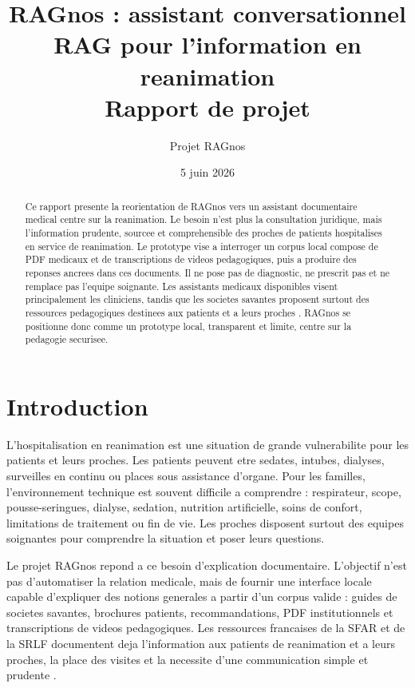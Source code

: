 \documentclass[11pt,a4paper]{article}
\title{\textbf{RAGnos : assistant conversationnel RAG pour l'information en reanimation}\\
\large Rapport de projet}
\author{Projet RAGnos}
\date{5 juin 2026}
\begin{document}
\maketitle

\begin{abstract}
Ce rapport presente la reorientation de RAGnos vers un assistant documentaire medical centre sur la reanimation. Le besoin n'est plus la consultation juridique, mais l'information prudente, sourcee et comprehensible des proches de patients hospitalises en service de reanimation. Le prototype vise a interroger un corpus local compose de PDF medicaux et de transcriptions de videos pedagogiques, puis a produire des reponses ancrees dans ces documents. Il ne pose pas de diagnostic, ne prescrit pas et ne remplace pas l'equipe soignante. Les assistants medicaux disponibles visent principalement les cliniciens, tandis que les societes savantes proposent surtout des ressources pedagogiques destinees aux patients et a leurs proches \autocite{uptodateExpertAI,clinicalKeyAI,dynaAI,openEvidence,doximityAsk,sccmPatientFamilyResources,esicmPatientFamily,icsPatientResources}. RAGnos se positionne donc comme un prototype local, transparent et limite, centre sur la pedagogie securisee.
\end{abstract}

\tableofcontents
\newpage

\section{Introduction}

L'hospitalisation en reanimation est une situation de grande vulnerabilite pour les patients et leurs proches. Les patients peuvent etre sedates, intubes, dialyses, surveilles en continu ou places sous assistance d'organe. Pour les familles, l'environnement technique est souvent difficile a comprendre : respirateur, scope, pousse-seringues, dialyse, sedation, nutrition artificielle, soins de confort, limitations de traitement ou fin de vie. Les proches disposent surtout des equipes soignantes pour comprendre la situation et poser leurs questions.

Le projet RAGnos repond a ce besoin d'explication documentaire. L'objectif n'est pas d'automatiser la relation medicale, mais de fournir une interface locale capable d'expliquer des notions generales a partir d'un corpus valide : guides de societes savantes, brochures patients, recommandations, PDF institutionnels et transcriptions de videos pedagogiques. Les ressources francaises de la SFAR et de la SRLF documentent deja l'information aux patients de reanimation et a leurs proches, la place des visites et la necessite d'une communication simple et prudente \autocite{sfarInfoPatientsRea,srlfVisitesProches}.
\end{document}
